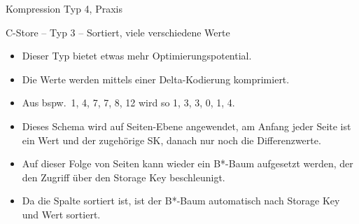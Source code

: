 \begin{frame}{Kompression Typ 4, Praxis}

\end{frame}

\begin{frame}{C-Store -- Typ 3 -- Sortiert, viele verschiedene Werte}
\begin{itemize}[<+->]
	\item Dieser Typ bietet etwas mehr Optimierungspotential.
	\item Die Werte werden mittels einer Delta-Kodierung komprimiert.
	\item Aus bspw.\ 1, 4, 7, 7, 8, 12 wird so 1, 3, 3, 0, 1, 4.
	\item Dieses Schema wird auf Seiten-Ebene angewendet, am Anfang jeder Seite ist ein Wert und der zugeh\"orige SK, danach nur noch die Differenzwerte.
	\item Auf dieser Folge von Seiten kann wieder ein B*-Baum aufgesetzt werden, der den Zugriff über den Storage Key beschleunigt.
	\item  Da die Spalte sortiert ist, ist der B*-Baum automatisch nach Storage Key und Wert sortiert.
\end{itemize}
\end{frame}

